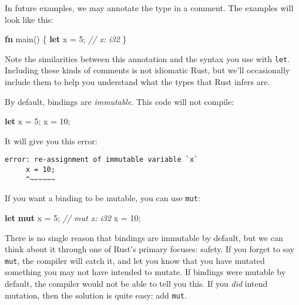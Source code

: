 \documentclass[a4paper,]{book}
\newenvironment{Shaded}{\begin{snugshade}}{\end{snugshade}}
\newcommand{\KeywordTok}[1]{\textcolor[rgb]{0.13,0.29,0.53}{\textbf{{#1}}}}
\newcommand{\DecValTok}[1]{\textcolor[rgb]{0.00,0.00,0.81}{{#1}}}
\newcommand{\CommentTok}[1]{\textcolor[rgb]{0.56,0.35,0.01}{\textit{{#1}}}}
\newcommand{\NormalTok}[1]{{#1}}
\begin{document}
In future examples, we may annotate the type in a comment. The examples
will look like this:

\begin{Shaded}
\begin{Highlighting}[]
\KeywordTok{fn} \NormalTok{main() \{}
    \KeywordTok{let} \NormalTok{x = }\DecValTok{5}\NormalTok{; }\CommentTok{// x: i32}
\NormalTok{\}}
\end{Highlighting}
\end{Shaded}

Note the similarities between this annotation and the syntax you use
with \texttt{let}. Including these kinds of comments is not idiomatic
Rust, but we'll occasionally include them to help you understand what
the types that Rust infers are.

By default, bindings are \emph{immutable}. This code will not compile:

\begin{Shaded}
\begin{Highlighting}[]
\KeywordTok{let} \NormalTok{x = }\DecValTok{5}\NormalTok{;}
\NormalTok{x = }\DecValTok{10}\NormalTok{;}
\end{Highlighting}
\end{Shaded}

It will give you this error:

\begin{verbatim}
error: re-assignment of immutable variable `x`
     x = 10;
     ^~~~~~~
\end{verbatim}

If you want a binding to be mutable, you can use \texttt{mut}:

\begin{Shaded}
\begin{Highlighting}[]
\KeywordTok{let} \KeywordTok{mut} \NormalTok{x = }\DecValTok{5}\NormalTok{; }\CommentTok{// mut x: i32}
\NormalTok{x = }\DecValTok{10}\NormalTok{;}
\end{Highlighting}
\end{Shaded}

There is no single reason that bindings are immutable by default, but we
can think about it through one of Rust's primary focuses: safety. If you
forget to say \texttt{mut}, the compiler will catch it, and let you know
that you have mutated something you may not have intended to mutate. If
bindings were mutable by default, the compiler would not be able to tell
you this. If you \emph{did} intend mutation, then the solution is quite
easy: add \texttt{mut}.
\end{document}
